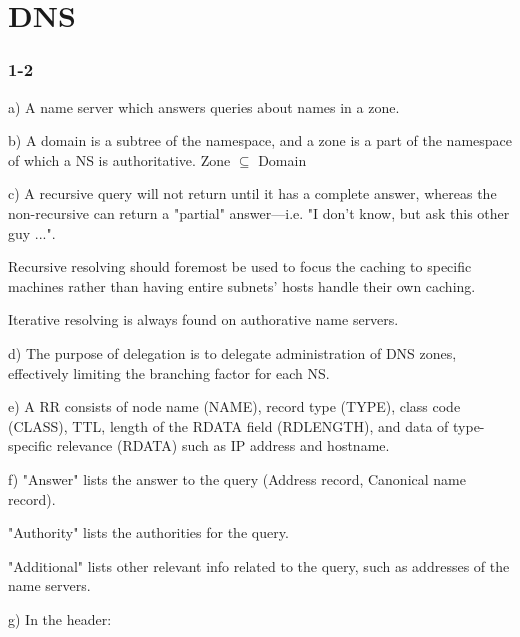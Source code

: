 
\chapter{DNS}
\subsection{1-2}
a) A name server which answers queries about names in a zone.

b) A domain is a subtree of the namespace, and a zone is a part of the namespace of which a NS is authoritative. Zone $\subseteq$ Domain

c) A recursive query will not return until it has a complete answer, whereas the non-recursive can return a "partial" answer---i.e. "I don't know, but ask this other guy ...".

Recursive resolving should foremost be used to focus the caching to specific machines rather than having entire subnets' hosts handle their own caching.

Iterative resolving is always found on authorative name servers.

d) The purpose of delegation is to delegate administration of DNS zones, effectively limiting the branching factor for each NS.

e) A RR consists of node name (NAME), record type (TYPE), class code (CLASS), TTL, length of the RDATA field (RDLENGTH), and data of type-specific relevance (RDATA) such as IP address and hostname.

f) "Answer" lists the answer to the query (Address record, Canonical name record).

"Authority" lists the authorities for the query.

"Additional" lists other relevant info related to the query, such as addresses of the name servers.

g) In the header:

